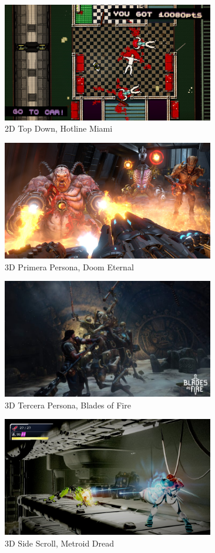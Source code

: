\begin{figure}[H]
  \centering
  \includegraphics[width=350px,clip=true]{hotline_miami.png}
  \caption{2D Top Down, Hotline Miami}
  \label{fig:hlmiami}
\end{figure}

\begin{figure}[H]
  \centering
  \includegraphics[width=350px,clip=true]{doom_eternal.png}
  \caption{3D Primera Persona, Doom Eternal}
  \label{fig:doometernal}
\end{figure}

\begin{figure}[H]
  \centering
  \includegraphics[width=350px,clip=true]{bof.png}
  \caption{3D Tercera Persona, Blades of Fire}
  \label{fig:bof}
\end{figure}

\begin{figure}[H]
  \centering
  \includegraphics[width=350px,clip=true]{dread.png}
  \caption{3D Side Scroll, Metroid Dread}
  \label{fig:mdread}
\end{figure}


